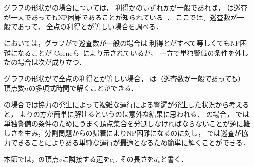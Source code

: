 \section{{\graphStar}}
\label{section: star}

グラフの形状が{\graphStar}の場合については，
利得か{\maxIdletime}のいずれかが一般であれば，
{\patProb}は巡査が一人であってもNP困難であることが知られている~\cite{coene2011charlemagne}．
ここでは，巡査数が一般であって，
全点の利得と{\maxIdletime}が等しい場合を調べる．

{\independentPatProb}においては，グラフが{\graphStar}で巡査数が一般の場合は
利得と{\maxIdletime}がすべて等しくてもNP困難になることが
Coeneら~\cite{coene2011charlemagne}により示されているが，
一方で単独警備の条件を外した{\patProb}の場合は次が成り立つ．

\begin{theo}
\label{theo:StarEqualProfitTimelimit}
グラフの形状が{\graphStar}で全点の利得と{\maxIdletime}が等しい場合，
{\patProb}は（巡査数が一般であっても）
頂点数$n$の多項式時間で解くことができる．
\end{theo}

{\graphLine}の場合では協力の発生によって複雑な運行による警邏が発生した状況から考えると，
{\independentPatProb}より{\patProb}の方が簡単に解けるというのは意外な結果に思われる．
{\graphStar}の場合，
{\independentPatProb}では
単独警備の条件のためにうまく頂点集合を分割しなければならないことが逆に難しさを生み，分割問題からの帰着によりNP困難になるのに対し，
{\patProb}では巡査が協力できることによりある単純な運行が最適となるため簡単に解くことができる．

本節では，{\graphStar}の頂点$v$に隣接する辺を$e_v$, その長さを$d_v$と書く．

